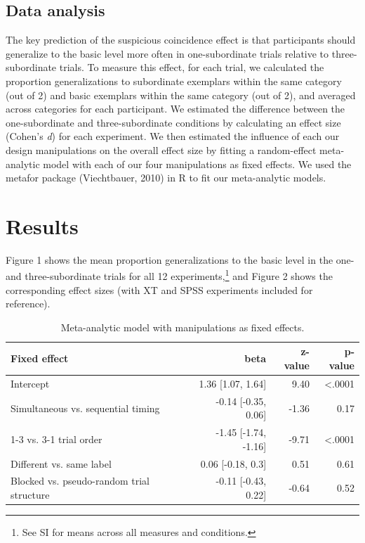 \documentclass[english,floatsintext,man]{apa6}
\theoremstyle{definition}
\theoremstyle{definition}
\theoremstyle{definition}
\theoremstyle{remark}
\begin{document}
\subsection{Data analysis}\label{data-analysis}

The key prediction of the suspicious coincidence effect is that
participants should generalize to the basic level more often in
one-subordinate trials relative to three-subordinate trials. To measure
this effect, for each trial, we calculated the proportion
generalizations to subordinate exemplars within the same category (out
of 2) and basic exemplars within the same category (out of 2), and
averaged across categories for each participant. We estimated the
difference between the one-subordinate and three-subordinate conditions
by calculating an effect size (Cohen's \emph{d}) for each experiment. We
then estimated the influence of each our design manipulations on the
overall effect size by fitting a random-effect meta-analytic model with
each of our four manipulations as fixed effects. We used the metafor
package (Viechtbauer, 2010) in R to fit our meta-analytic models.

\section{Results}\label{results}

Figure 1 shows the mean proportion generalizations to the basic level in
the one- and three-subordinate trials for all 12
experiments,\footnote{See SI for means across all measures and conditions.}
and Figure 2 shows the corresponding effect sizes (with XT and SPSS
experiments included for reference).

\begin{table}

\caption{\label{tab:unnamed-chunk-5}Meta-analytic model with manipulations as fixed effects.}
\centering
\fontsize{12}{14}\selectfont
\begin{tabular}[t]{lrrr}
\toprule
Fixed effect & beta & z-value & p-value\\
\midrule
Intercept & 1.36 [1.07, 1.64] & 9.40 & <.0001\\
Simultaneous vs. sequential timing & -0.14 [-0.35, 0.06] & -1.36 & 0.17\\
1-3 vs. 3-1 trial order & -1.45 [-1.74, -1.16] & -9.71 & <.0001\\
Different vs. same label & 0.06 [-0.18, 0.3] & 0.51 & 0.61\\
Blocked vs. pseudo-random trial structure & -0.11 [-0.43, 0.22] & -0.64 & 0.52\\
\bottomrule
\end{tabular}
\end{table}
\end{document}
